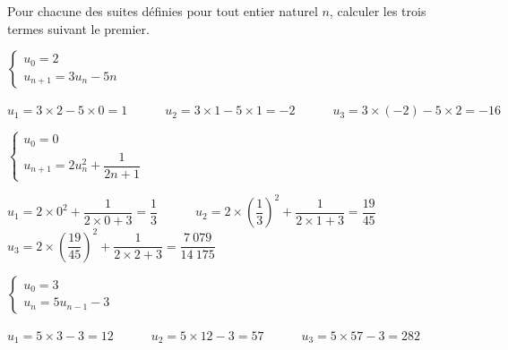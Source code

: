 \documentclass[12pt,a4paper]{article}  %
\begin{document}
Pour chacune des suites définies pour tout entier naturel $n$, calculer les trois termes suivant le premier.
\begin{enumMet}
    \item $\left\{\begin{array}{l}u_{0}=2 \\ u_{n+1}=3u_{n}-5 n\end{array}\right.$\\
    \begin{corrBox}
        $u_1=3\times2-5\times0=1\quad\quad\quad u_2=3\times1-5\times1=-2\quad\quad\quad u_3=3\times(-2)-5\times2=-16$
    \end{corrBox}
    \item $\left\{\begin{array}{l}u_{0}=0 \\ u_{n+1}=2u_{n}^{2}+\dfrac{1}{2 n+1}\end{array}\right.$\\
    \begin{corrBox}
        $u_1=2\times0^2+\dfrac{1}{2\times0+3}=\dfrac{1}{3}\quad\quad\quad u_2=2\times\left(\dfrac{1}{3}\right)^2+\dfrac{1}{2\times1+3}=\dfrac{19}{45}$\\
        $u_3=2\times\left(\dfrac{19}{45}\right)^2+\dfrac{1}{2\times2+3}=\dfrac{7\ 079}{14\ 175}$
    \end{corrBox}
    \item {} $\left\{\begin{array}{l}u_{0}=3 \\ u_{n}=5 u_{n-1}-3\end{array}\right.$\\
    \begin{corrBox}
        $u_1=5\times3-3=12\quad\quad\quad u_2=5\times12-3=57\quad\quad\quad u_3=5\times57-3=282$
    \end{corrBox}
\end{enumMet}
\end{document}
